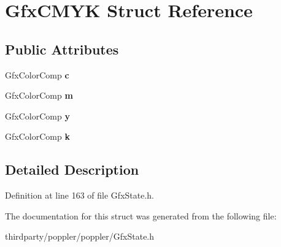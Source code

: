 \hypertarget{struct_gfx_c_m_y_k}{}\section{Gfx\+C\+M\+YK Struct Reference}
\label{struct_gfx_c_m_y_k}
\subsection*{Public Attributes}
\begin{DoxyCompactItemize}
\item 
\mbox{\label{struct_gfx_c_m_y_k_a8f6c317c297bc2dce6b959e36e0b4a2f}} 
Gfx\+Color\+Comp {\bfseries c}
\item 
\mbox{\label{struct_gfx_c_m_y_k_a87b0477bdeed0d9697ae00421ad04012}} 
Gfx\+Color\+Comp {\bfseries m}
\item 
\mbox{\label{struct_gfx_c_m_y_k_a69d2f564a8042ef4522e5ea675c3e9d5}} 
Gfx\+Color\+Comp {\bfseries y}
\item 
\mbox{\label{struct_gfx_c_m_y_k_ab6176d78a5ef8a80f13830460498edfe}} 
Gfx\+Color\+Comp {\bfseries k}
\end{DoxyCompactItemize}


\subsection{Detailed Description}


Definition at line 163 of file Gfx\+State.\+h.



The documentation for this struct was generated from the following file\+:\begin{DoxyCompactItemize}
\item 
thirdparty/poppler/poppler/Gfx\+State.\+h\end{DoxyCompactItemize}
